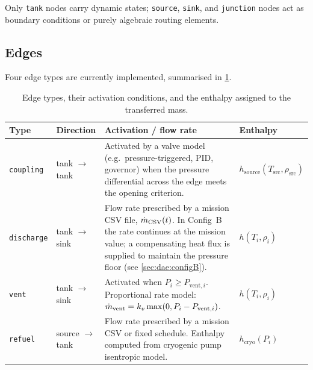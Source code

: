 Only \texttt{tank} nodes carry dynamic states; \texttt{source}, \texttt{sink},
and \texttt{junction} nodes act as boundary conditions or purely algebraic
routing elements.

\subsection{Edges}
\label{sec:network:edges}

Four edge types are currently implemented, summarised in
\cref{tab:edge-types}.

\begin{table}[ht]
\centering
\caption{Edge types, their activation conditions, and the enthalpy assigned to
the transferred mass.}
\label{tab:edge-types}
\begin{tabularx}{\linewidth}{@{} l l X l @{}}
\toprule
\textbf{Type} & \textbf{Direction} & \textbf{Activation / flow rate} & \textbf{Enthalpy} \\
\midrule
\texttt{coupling}  & tank $\to$ tank &
  Activated by a valve model (e.g.\ pressure-triggered, PID, governor)
  when the pressure differential across the edge meets the opening criterion. &
  $h_\text{source}(T_\text{src},\rho_\text{src})$ \\[6pt]

\texttt{discharge} & tank $\to$ sink &
  Flow rate prescribed by a mission CSV file, $\dot{m}_\text{CSV}(t)$.
  In Config~B the rate continues at the mission value; a compensating
  heat flux is supplied to maintain the pressure floor
  (see \cref{sec:dae:configB}). &
  $h(T_i,\rho_i)$ \\[6pt]

\texttt{vent}      & tank $\to$ sink &
  Activated when $P_i \ge P_{\text{vent},i}$.
  Proportional rate model: $\dot{m}_\text{vent} = k_v\max(0, P_i - P_{\text{vent},i})$. &
  $h(T_i,\rho_i)$ \\[6pt]

\texttt{refuel}    & source $\to$ tank &
  Flow rate prescribed by a mission CSV or fixed schedule.
  Enthalpy computed from cryogenic pump isentropic model. &
  $h_\text{cryo}(P_i)$ \\
\bottomrule
\end{tabularx}
\end{table}


